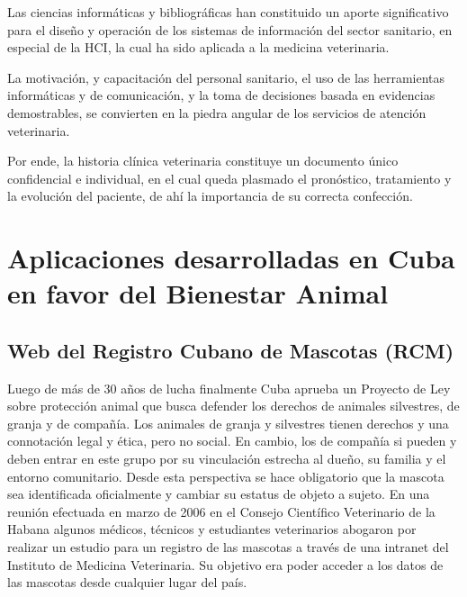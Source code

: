 Las ciencias informáticas y bibliográficas han constituido un aporte significativo para el diseño y operación de los sistemas de información del sector sanitario, en especial de la HCI, la cual ha sido aplicada a la medicina veterinaria.

La motivación, y capacitación del personal sanitario, el uso de las herramientas informáticas y de comunicación, y la toma de decisiones basada en evidencias demostrables, se convierten en la piedra angular de los servicios de atención veterinaria.

Por ende, la historia clínica veterinaria constituye un documento único confidencial e individual, en el cual queda plasmado el pronóstico, tratamiento y la evolución del paciente, de ahí la importancia de su correcta confección. 
	

\newpage
\section{Aplicaciones desarrolladas en Cuba en favor del Bienestar Animal}\label{chapter:introduction}

\subsection{Web del Registro Cubano de Mascotas (RCM)}\label{chapter:introduction}





Luego de más de 30 años de lucha finalmente Cuba aprueba un Proyecto de Ley sobre protección animal que busca defender los derechos de animales silvestres, de granja y de compañía. Los animales de granja y silvestres tienen derechos y una connotación legal y ética, pero no social. En cambio, los de compañía si pueden y deben entrar en este grupo por su vinculación estrecha al dueño, su familia y el entorno comunitario. Desde esta perspectiva se hace obligatorio que la mascota sea identificada oficialmente y cambiar su estatus de objeto a sujeto. En una reunión efectuada en marzo de 2006 en el Consejo Científico Veterinario de la Habana algunos médicos, técnicos y estudiantes veterinarios abogaron por realizar un estudio para un registro de las mascotas a través de una intranet del Instituto de Medicina Veterinaria. Su objetivo era poder acceder a los datos de las mascotas desde cualquier lugar del país.

